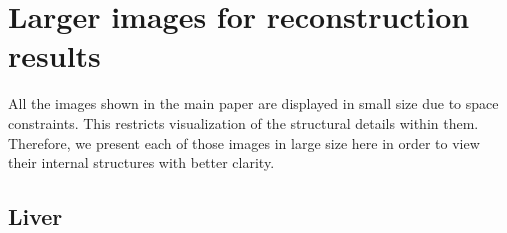 \documentclass{article}
\begin{document}
\section{Larger images for reconstruction results}
All the images shown in the main paper are displayed in small size due to space constraints. This restricts visualization of the structural details within them. Therefore, we present each of those images in large size here in order to view their internal structures with better clarity. 
\subsection{Liver}
\begin{figure}[!h]
\centering
{}\hfill
{}\hfill
{}\hfill

\end{figure}
\end{document}
